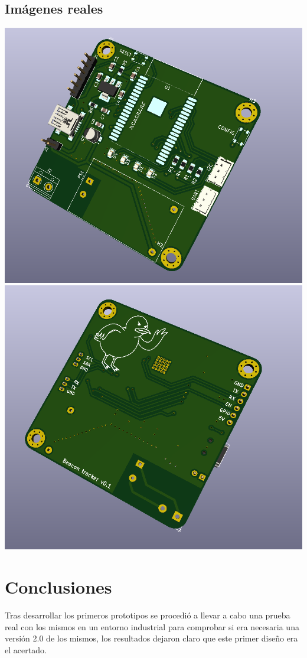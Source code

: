 \documentclass[a4paper ,12pt, onecolumn]{article}
\begin{document}
    \subsection{Imágenes reales}
        \includegraphics[scale=0.2]{../receiver_1.PNG}
        \includegraphics[scale=0.4]{../receiver_2.PNG}

\section{Conclusiones}
    Tras desarrollar los primeros prototipos se procedió a llevar a cabo una prueba real con los mismos 
    en un entorno industrial para comprobar si era necesaria una versión 2.0 de los mismos, los resultados
    dejaron claro que este primer diseño era el acertado.
\end{document}
